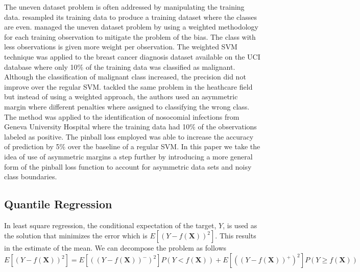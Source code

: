 \documentclass[twoside,11pt]{article}
\begin{document}
The uneven dataset problem is often addressed by manipulating the training data. \citet{Liou08} resampled its training data to produce a training dataset where the classes are even. \citet{Huang05} managed the uneven dataset problem by using a weighted methodology for each training observation to mitigate the problem of the bias. The class with less observations is given more weight per observation. The weighted SVM technique was applied to the breast cancer diagnosis dataset available on the UCI database where only 10\% of the training data was classified as malignant. Although the classification of malignant class increased, the precision did not improve over the regular SVM. \citet{Cohen03} tackled the same problem in the heathcare field but instead of using a weighted approach, the authors used an asymmetric margin where different penalties where assigned to classifying the wrong class. The method was applied to the identification of nosocomial infections from Geneva University Hospital where the training data had 10\% of the observations labeled as positive. The pinball loss employed was able to increase the accuracy of prediction by 5\% over the baseline of a regular SVM. In this paper we take the idea of \citet{Cohen03} use of asymmetric margins a step further by introducing a more general form of the pinball loss function to account for asymmetric data sets and noisy class boundaries. 

\subsection{Quantile Regression}
In least square regression, the conditional expectation of the target, $Y$, is used as the solution that minimizes the error which is $E[(Y-f(\mathbf{X}))^2]$. This results in the estimate of the mean. We can decompose the problem as follows
\begin{equation}
 E[(Y-f(\mathbf{X}))^2]= E[((Y-f(\mathbf{X}))^-)^2]P(Y<f(\mathbf{X}))+E[((Y-f(\mathbf{X}))^+)^2]P(Y \geq f(\mathbf{X}))
\end{equation}
\end{document}
